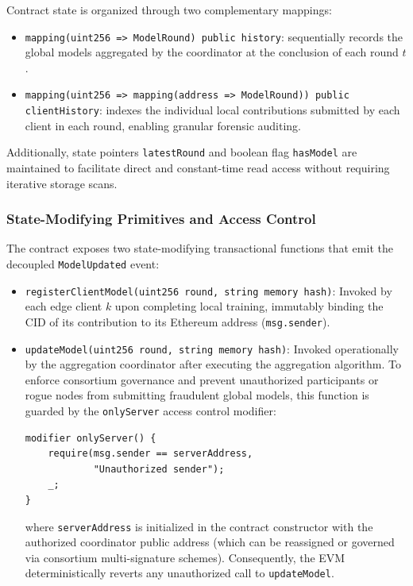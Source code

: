 Contract state is organized through two complementary mappings:
\begin{itemize}
    \item \texttt{mapping(uint256 => ModelRound) public history}: sequentially records the global models aggregated by the coordinator at the conclusion of each round $t$.
    \item \texttt{mapping(uint256 => mapping(address => ModelRound)) public clientHistory}: indexes the individual local contributions submitted by each client in each round, enabling granular forensic auditing.
\end{itemize}

Additionally, state pointers \texttt{latestRound} and boolean flag \texttt{hasModel} are maintained to facilitate direct and constant-time read access without requiring iterative storage scans.

\subsubsection{State-Modifying Primitives and Access Control}
The contract exposes two state-modifying transactional functions that emit the decoupled \texttt{ModelUpdated} event:
\begin{itemize}
    \item \texttt{registerClientModel(uint256 round, string memory hash)}: Invoked by each edge client $k$ upon completing local training, immutably binding the CID of its contribution to its Ethereum address (\texttt{msg.sender}).
    \item \texttt{updateModel(uint256 round, string memory hash)}: Invoked operationally by the aggregation coordinator after executing the aggregation algorithm. To enforce consortium governance and prevent unauthorized participants or rogue nodes from submitting fraudulent global models, this function is guarded by the \texttt{onlyServer} access control modifier:
    \begin{verbatim}
modifier onlyServer() {
    require(msg.sender == serverAddress, 
            "Unauthorized sender");
    _;
}
    \end{verbatim}
    where \texttt{serverAddress} is initialized in the contract constructor with the authorized coordinator public address (which can be reassigned or governed via consortium multi-signature schemes). Consequently, the EVM deterministically reverts any unauthorized call to \texttt{updateModel}.
\end{itemize}

